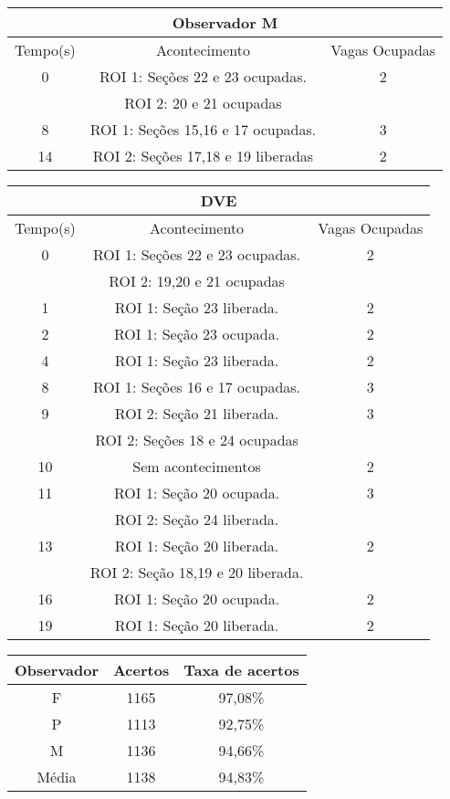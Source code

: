 \begin{center}
\begin{tabular}{|c||c||c|}
\hline
\multicolumn{3}{|c|}{Observador M}  \\ \hline \hline
Tempo(s) & Acontecimento & Vagas Ocupadas\\ \hline
0 & ROI 1: Seções 22 e 23 ocupadas. & 2 \\
 & ROI 2: 20 e 21 ocupadas & \\ \hline
8 & ROI 1: Seções 15,16 e 17 ocupadas. & 3 \\ \hline
14 & ROI 2: Seções 17,18 e 19 liberadas & 2\\
\hline
\end{tabular}
\end{center}

\begin{center}
\begin{tabular}{|c||c||c|}
\hline
\multicolumn{3}{|c|}{DVE}  \\ \hline \hline
Tempo(s) & Acontecimento & Vagas Ocupadas\\ \hline
0 & ROI 1: Seções 22 e 23 ocupadas. & 2 \\
 & ROI 2: 19,20 e 21 ocupadas &  \\ \hline
1 & ROI 1: Seção 23 liberada. & 2 \\ \hline
2 & ROI 1: Seção 23 ocupada. & 2 \\ \hline
4 & ROI 1: Seção 23 liberada. & 2 \\ \hline
8 & ROI 1: Seções 16 e 17 ocupadas. & 3 \\ \hline
9 & ROI 2: Seção 21 liberada. & 3 \\ 
 & ROI 2: Seções 18 e 24 ocupadas &  \\ \hline
10 & Sem acontecimentos & 2 \\ \hline
11 & ROI 1: Seção 20 ocupada. & 3 \\ 
 & ROI 2: Seção 24 liberada. \\ \hline
13 & ROI 1: Seção 20 liberada. & 2 \\
 & ROI 2: Seção 18,19 e 20 liberada. & \\ \hline
16 & ROI 1: Seção 20 ocupada. & 2 \\ \hline
19 & ROI 1: Seção 20 liberada. & 2 \\
\hline
\end{tabular}
\end{center}

\begin{center}
\begin{tabular}{|c||c||c|}
\hline
Observador & Acertos & Taxa de acertos \\ \hline
F & 1165 & 97,08\% \\  \hline
P & 1113 & 92,75\% \\ \hline
M & 1136 & 94,66\% \\ \hline
Média & 1138 & 94,83\% \\
\hline
\end{tabular}
\end{center}


